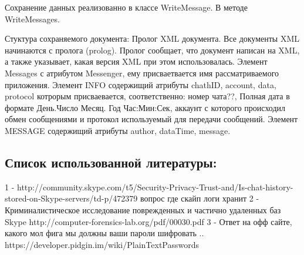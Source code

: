Сохранение данных реализованно в классе WriteMessage. В методе WriteMessages. 

Стуктура сохраняемого документа:
  Пролог XML документа. Все документы XML начинаются с пролога (prolog). Пролог сообщает, что документ написан на XML, а также указывает, какая версия XML при этом использовалась.  
  Элемент Messages с атрибутом Messenger, ему присваетвается имя рассматриваемого приложения.
  Элемент INFO содержищий атрибуты chathID, account, data, protocol котрорым присваевается, соответственно: номер чата??, Полная дата в формате  День.Число Месяц. Год Час:Мин:Сек, аккаунт с которого происходил обмен сообщениями и протокол используемый для передачи сообщений. 
  Элемент MESSAGE содержищий атрибуты author, dataTime, message.


\subsection{Список использованной литературы:}
1 -  http://community.skype.com/t5/Security-Privacy-Trust-and/Is-chat-history-stored-on-Skype-servers/td-p/472379 вопрос где скайп логи хранит
2 - Криминалистическое исследование поврежденных и частично удаленных баз Skype http://computer-forensics-lab.org/pdf/00030.pdf
3 - Ответ на офф сайте, какого мол фига мы должны ваши пароли шифровать .. https://developer.pidgin.im/wiki/PlainTextPasswords